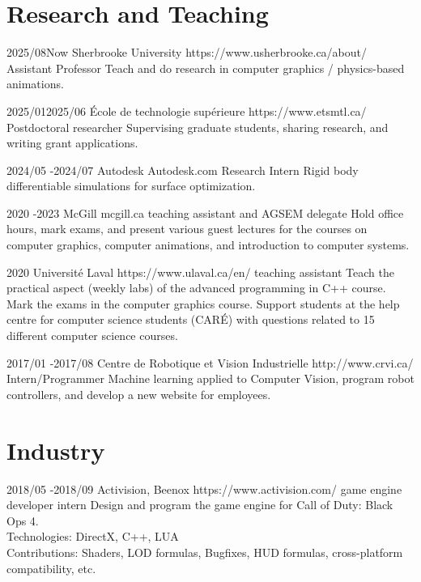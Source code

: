 \documentclass[10pt]{article} %
\begin{document}

\section{Research and Teaching}
\job
{2025/08}{Now}
{Sherbrooke University}
{https://www.usherbrooke.ca/about/}
{Assistant Professor}
{Teach and do research in computer graphics / physics-based animations.}

\job
{2025/01}{2025/06}
{École de technologie supérieure}
{https://www.etsmtl.ca/}
{Postdoctoral researcher}
{Supervising graduate students, sharing research, and writing grant applications.}

\job
{2024/05 -}{2024/07}
{Autodesk}
{Autodesk.com}
{Research Intern}
{Rigid body differentiable simulations for surface optimization.}

\job
{2020  -}{2023}
{McGill}
{mcgill.ca}
{teaching assistant and AGSEM delegate}
{Hold office hours, mark exams, and present various guest lectures for the courses on computer graphics, computer animations, and introduction to computer systems.}

\job
{}{2020}
{Université Laval}
{https://www.ulaval.ca/en/}
{teaching assistant}
{Teach the practical aspect (weekly labs) of the advanced programming in C++ course. Mark the exams in the computer graphics course. Support students at the help centre for computer science students (CARÉ) with questions related to 15 different computer science courses.}


\job
{2017/01 -}{2017/08}
{Centre de Robotique et Vision Industrielle}
{http://www.crvi.ca/}
{Intern/Programmer}
{Machine learning applied to Computer Vision, program robot controllers, and develop a new website for employees.}

\section{Industry}

\job
{2018/05 -}{2018/09}
{Activision, Beenox}
{https://www.activision.com/}
{game engine developer intern}
{Design and program the game engine for Call of Duty: Black Ops 4.\\
 Technologies: DirectX, C++, LUA \\
 Contributions: Shaders, LOD formulas, Bugfixes, HUD formulas, cross-platform compatibility, etc.}
\end{document}
